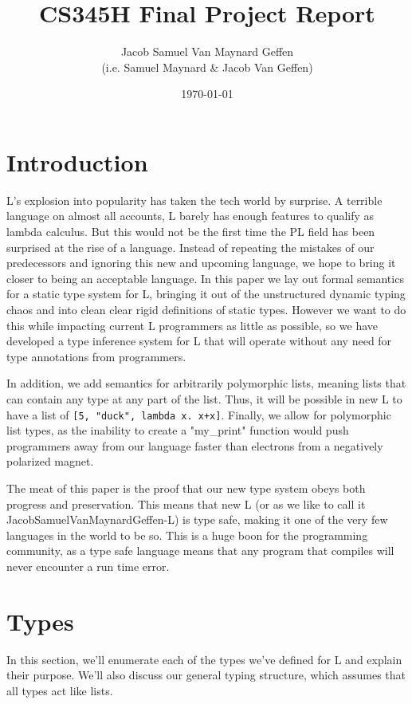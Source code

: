 \documentclass[12pt]{article}
\title{CS345H Final Project Report}
\author{Jacob Samuel Van Maynard Geffen \\ (i.e. Samuel Maynard \& Jacob Van Geffen)}
\date{\today}
\begin{document}
\maketitle

\section{Introduction}

L's explosion into popularity has taken the tech world by surprise. A terrible language on almost all accounts, L barely has enough features to qualify as lambda calculus. But this would not be the first time the PL field has been surprised at the rise of a language. Instead of repeating the mistakes of our predecessors and ignoring this new and upcoming language, we hope to bring it closer to being an acceptable language. In this paper we lay out formal semantics for a static type system for L, bringing it out of the unstructured dynamic typing chaos and into clean clear rigid definitions of static types. However we want to do this while impacting current L programmers as little as possible, so we have developed a type inference system for L that will operate without any need for type annotations from programmers.

In addition, we add semantics for arbitrarily polymorphic lists, meaning lists that can contain any type at any part of the list. Thus, it will be possible in new L to have a list of \texttt{[5, "duck", lambda x.\ x+x]}. Finally, we allow for polymorphic list types, as the inability to create a "my\_print" function would push programmers away from our language faster than electrons from a negatively polarized magnet.

The meat of this paper is the proof that our new type system obeys both progress and preservation. This means that new L (or as we like to call it JacobSamuelVanMaynardGeffen-L) is type safe, making it one of the very few languages in the world to be so. This is a huge boon for the programming community, as a type safe language means that any program that compiles will never encounter a run time error.

\section{Types}

In this section, we'll enumerate each of the types we've defined for L and explain their purpose. We'll also discuss our general typing structure, which assumes that all types act like lists.
\end{document}
